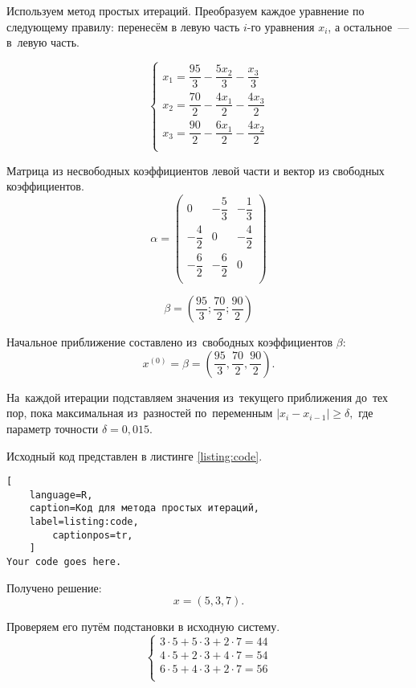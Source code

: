 \documentclass[14pt]{extarticle}
\begin{document}

\vspace{1em}

Используем метод простых итераций. Преобразуем каждое уравнение по следующему правилу: перенесём в левую часть $i$-го уравнения $x_i$, а остальное~--- в~левую часть.

$$\begin{cases}
x_1 = \dfrac{95}{3} -\dfrac{5x_2}{3} - \dfrac{x_3}{3}  \\[0.1em]
x_2 = \dfrac{70}{2} -\dfrac{4x_1}{2} - \dfrac{4x_3}{2} \\[0.1em]
x_3 = \dfrac{90}{2} -\dfrac{6x_1}{2} - \dfrac{4x_2}{2} \\[0.1em]
\end{cases}$$

\vspace{1em}

Матрица из несвободных коэффициентов левой части и вектор из свободных коэффициентов.
$$
\alpha =
\begin{pmatrix}
0             & -\dfrac{5}{3}  & - \dfrac{1}{3} \\[0.2em]
-\dfrac{4}{2} & 0              & - \dfrac{4}{2} \\[0.2em]
-\dfrac{6}{2} & -\dfrac{6}{2}  & 0              \\[0.2em]
\end{pmatrix}
$$

$$
\beta = \left(\dfrac{95}{3}; \dfrac{70}{2}; \dfrac{90}{2}\right)
$$

Начальное приближение составлено из~свободных коэффициентов $\beta$:
$$x^{(0)} = \beta = \left(\dfrac{95}{3}, \dfrac{70}{2}, \dfrac{90}{2}\right).$$

На~каждой итерации подставляем значения из~текущего приближения до~тех пор,
пока максимальная из~разностей по~переменным
$|x_i - x_{i-1}| \geqslant \delta,$ где параметр точности $\delta = 0{,}015$.

Исходный код представлен в листинге \ref{listing:code}.

\begin{lstlisting}[
	language=R,
	caption=Код для метода простых итераций,
	label=listing:code,
        captionpos=tr,
	]
Your code goes here.
\end{lstlisting}

Получено решение:
$$x = \left(5, 3, 7\right).$$

Проверяем его путём подстановки в исходную систему.
$$\begin{cases}
3 \cdot 5 + 5 \cdot 3 + 2 \cdot 7 = 44 \\
4 \cdot 5 + 2 \cdot 3 + 4 \cdot 7 = 54 \\
6 \cdot 5 + 4 \cdot 3 + 2 \cdot 7 = 56 \\
\end{cases}$$
\end{document}
